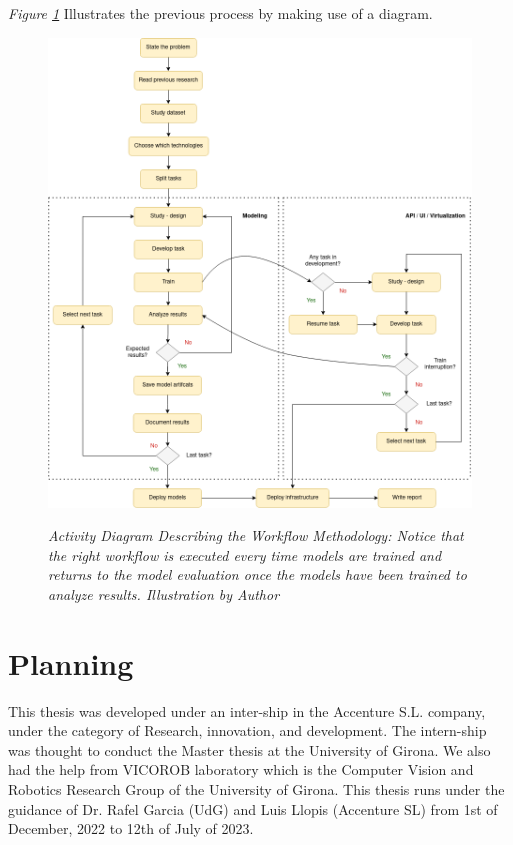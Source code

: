 \textit{Figure \ref{fig:flux_development}} Illustrates the previous process by making use of a diagram.

\newpage


\begin{figure}[H]
\centering
\includegraphics[width=\textwidth]{imatges/planing_and_methodology/EmplyedMethodology.png}
\caption[Activity Diagram Describing the Methodology.]{\textit{Activity Diagram Describing the Workflow Methodology: Notice that the right workflow is executed every time models are trained and returns to the model evaluation once the models have been trained to analyze results. Illustration by Author}}
{\label{fig:flux_development}}
\end{figure}


\newpage


\section{Planning}

This thesis was developed under an inter-ship in the Accenture S.L. company, under the category of Research, innovation, and development. The intern-ship was thought to conduct the Master thesis at the University of Girona. We also had the help from VICOROB laboratory which is the Computer Vision and Robotics Research Group of the University of Girona. This thesis runs under the guidance of Dr. Rafel Garcia (UdG) and Luis Llopis (Accenture SL) from 1st of December, 2022 to 12th of July of 2023. \\

